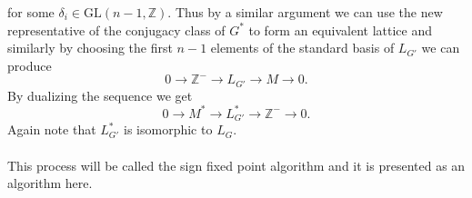 \documentclass{article}
\theoremstyle{plain}
\theoremstyle{definition}
\newcommand{\Z}{\ensuremath{\mathbb{Z}}}
\newcommand{\Q}{\ensuremath{\mathbb{Q}}}
\begin{document}
for some $\delta_i \in \mathrm{GL}(n-1,\Z).$ Thus by a similar argument we can use the new representative of the conjugacy class of $G^*$ to form an equivalent lattice and similarly by choosing the first $n-1$ elements of the standard basis of $L_{G'}$ we can produce 
$$0 \longrightarrow \Z^- \longrightarrow L_{G'} \longrightarrow M \longrightarrow 0.$$
By dualizing the sequence we get 
$$0 \longrightarrow M^* \longrightarrow L^*_{G'} \longrightarrow \Z^- \longrightarrow 0.$$
Again note that $L^*_{G'}$ is isomorphic to $L_G$.\\
\\
This process will be called the sign fixed point algorithm and it is presented as an algorithm here. 
\end{document}
